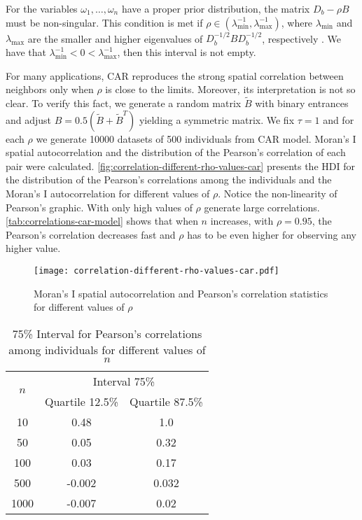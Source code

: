 For the variables $\omega_1, \dots, \omega_n$ have a proper prior
distribution, the matrix $D_{b} - \rho B$ must be non-singular. This
condition is met if $\rho \in (\lambda_{\min}^{-1}, \lambda_{\max}^{-1})$, where
$\lambda_{\min}$ and $\lambda_{\max}$ are the smaller and higher eigenvalues of
$D_{b}^{-1/2}BD_{b}^{-1/2}$, respectively \cite[p.
94]{banerjee2003hierarchical}. We have that $\lambda_{\min}^{-1} < 0 <
\lambda_{\max}^{-1}$, then this interval is not empty. 

For many applications, CAR reproduces the strong spatial correlation between 
neighbors only when $\rho$ is close to the limits. Moreover, its
interpretation is not so clear. To verify this fact, we generate a random
matrix $\tilde{B}$ with binary entrances and adjust $B =
0.5(\tilde{B} + \tilde{B}^T)$ yielding a symmetric matrix. We fix $\tau =
1$ and for each $\rho$ we generate 10000 datasets of 500 individuals from CAR
model. Moran's I spatial autocorrelation and the distribution of the Pearson's
correlation of each pair were calculated.
\autoref{fig:correlation-different-rho-values-car} presents the HDI for the
distribution of the Pearson's correlations among the individuals and the
Moran's I autocorrelation for different values of $\rho$. Notice the
non-linearity of Pearson's graphic. With only high values of $\rho$ generate
large correlations. \autoref{tab:correlations-car-model} shows that when $n$
increases, with $\rho=0.95$, the Pearson's correlation decreases fast and
$\rho$ has to be even higher for observing any higher value. 

\begin{figure}[htbp]
  \centering
  \caption{\label{fig:correlation-different-rho-values-car}Moran's I spatial
  autocorrelation and Pearson's correlation statistics for different values of
  $\rho$}
  \texttt{[image: correlation-different-rho-values-car.pdf]}
\end{figure}

\begin{table}[htbp]
  \centering
  \caption{\label{tab:correlations-car-model}75\% Interval for Pearson's correlations among
  individuals for different values of $n$}
  \begin{tabular}{ccc}
  \hline
  \multirow{2}{*}{$n$} & \multicolumn{2}{c}{Interval 75\%} \\ \cline{2-3} 
   & Quartile 12.5\% & Quartile 87.5\% \\ \hline
  10 & 0.48 & 1.0 \\
  50 & 0.05 & 0.32 \\
  100 & 0.03 & 0.17 \\
  500 & -0.002 & 0.032 \\
  1000 & -0.007 & 0.02 \\ \hline
  \end{tabular}
\end{table}

